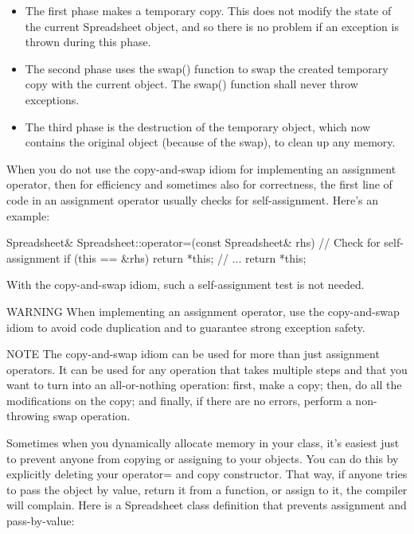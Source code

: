 \begin{itemize}
\item
The first phase makes a temporary copy. This does not modify the state of the current Spreadsheet object, and so there is no problem if an exception is thrown during this phase.

\item
The second phase uses the swap() function to swap the created temporary copy with the current object. The swap() function shall never throw exceptions.

\item
The third phase is the destruction of the temporary object, which now contains the original object (because of the swap), to clean up any memory.
\end{itemize}

When you do not use the copy-and-swap idiom for implementing an assignment operator, then for efficiency and sometimes also for correctness, the first line of code in an assignment operator usually checks for self-assignment. Here’s an example:

\begin{cpp}
Spreadsheet& Spreadsheet::operator=(const Spreadsheet& rhs)
{
    // Check for self-assignment
    if (this == &rhs) { return *this; }
    // ...
    return *this;
}
\end{cpp}

With the copy-and-swap idiom, such a self-assignment test is not needed.

\begin{myWarning}{WARNING}
When implementing an assignment operator, use the copy-and-swap idiom to avoid code duplication and to guarantee strong exception safety.
\end{myWarning}

\begin{myNotic}{NOTE}
The copy-and-swap idiom can be used for more than just assignment operators. It can be used for any operation that takes multiple steps and that you want to turn into an all-or-nothing operation: first, make a copy; then, do all the modifications on the copy; and finally, if there are no errors, perform a non-throwing swap operation.
\end{myNotic}


Sometimes when you dynamically allocate memory in your class, it’s easiest just to prevent anyone from copying or assigning to your objects. You can do this by explicitly deleting your operator= and copy constructor. That way, if anyone tries to pass the object by value, return it from a function, or assign to it, the compiler will complain. Here is a Spreadsheet class definition that prevents assignment and pass-by-value:

